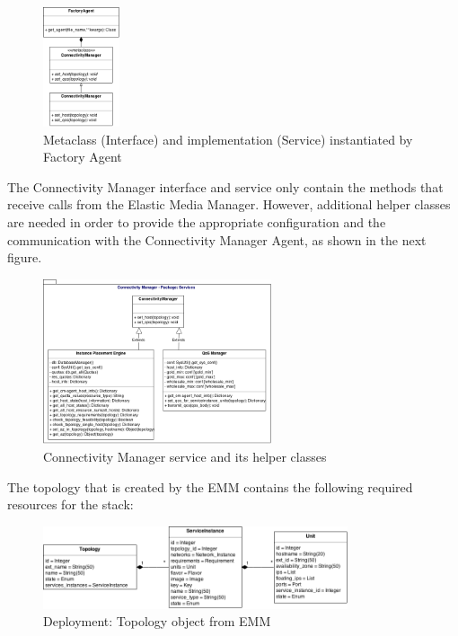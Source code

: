 \begin{figure}[H]
\centering

\includegraphics[width=0.2\textwidth]{images/design/cm-emm_interface_classes}

\caption{Metaclass (Interface) and implementation (Service) instantiated by Factory Agent}
\end{figure}

The Connectivity Manager interface and service only contain the methods that receive calls from the Elastic Media Manager. However, additional helper classes are needed in order to provide the appropriate configuration and the communication with the Connectivity Manager Agent, as shown in the next figure.

\begin{figure}[H]
\centering

\includegraphics[width=0.6\textwidth]{images/design/cm_class_diagram}

\caption{Connectivity Manager service and its helper classes}
\end{figure}

The topology that is created by the EMM contains the following required resources for the stack:

\begin{figure}[H]
\centering

\includegraphics[width=0.8\textwidth]{images/design/cm_topology_object}

\caption{Deployment: Topology object from EMM}
\end{figure}

